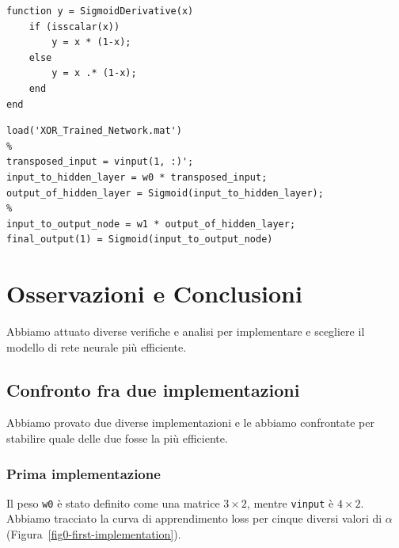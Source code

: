 \documentclass[a4paper,12pt]{article}
\begin{document}
\vspace{1cm}

\begin{lstlisting}[style=Matlab-editor,title=\texttt{SigmoidDerivative.mat}]
function y = SigmoidDerivative(x)
    if (isscalar(x))
        y = x * (1-x);
    else
        y = x .* (1-x);
    end
end
\end{lstlisting}

\vspace{1cm}

\begin{lstlisting}[style=Matlab-editor,title=\texttt{XOR\_Test.mat}]
% Carica i dati della rete gia' addestrata
load('XOR_Trained_Network.mat')
%
transposed_input = vinput(1, :)';
input_to_hidden_layer = w0 * transposed_input;
output_of_hidden_layer = Sigmoid(input_to_hidden_layer);
%
input_to_output_node = w1 * output_of_hidden_layer;
final_output(1) = Sigmoid(input_to_output_node)
\end{lstlisting}



\newpage
\section{Osservazioni e Conclusioni}

Abbiamo attuato diverse verifiche e analisi per implementare e scegliere il modello di rete neurale più efficiente.


\setcounter{subsection}{-1}
\subsection{Confronto fra due implementazioni}

Abbiamo provato due diverse implementazioni e le abbiamo confrontate per stabilire quale delle due fosse la più efficiente.

\subsubsection{Prima implementazione}
Il peso \texttt{w0} è stato definito come una matrice $3\times 2$, mentre \texttt{vinput} è $4\times 2$. Abbiamo tracciato la curva di apprendimento loss per cinque diversi valori di $\alpha$ (Figura~\vref{fig0-first-implementation}).
\end{document}
